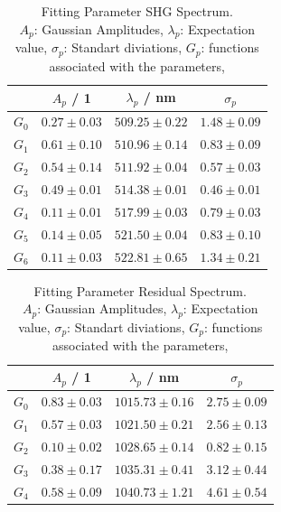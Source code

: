 \begin{table}[H]
    \label{}
    \centering
    \caption{Fitting Parameter SHG Spectrum. \\
    $A_p$: Gaussian Amplitudes,
    $\lambda_p$: Expectation value,
    $\sigma_p$: Standart diviations,
    $G_p$: functions associated with the parameters,}
    
    \begin{tabular}{c|ccc} \hline
        &  $A_p$ / 1 &  $\lambda_p$ / nm & $\sigma_p$ \\ \hline \hline 
    $G_0$&$0.27 \pm 0.03$&$509.25 \pm 0.22$&$1.48 \pm 0.09$\\ \hline
    $G_1$&$0.61 \pm 0.10$&$510.96 \pm 0.14$&$0.83 \pm 0.09$\\ \hline
    $G_2$&$0.54 \pm 0.14$&$511.92 \pm 0.04$&$0.57 \pm 0.03$\\ \hline
    $G_3$&$0.49 \pm 0.01$&$514.38 \pm 0.01$&$0.46 \pm 0.01$\\ \hline
    $G_4$&$0.11 \pm 0.01$&$517.99 \pm 0.03$&$0.79 \pm 0.03$\\ \hline
    $G_5$&$0.14 \pm 0.05$&$521.50 \pm 0.04$&$0.83 \pm 0.10$\\ \hline
    $G_6$&$0.11 \pm 0.03$&$522.81 \pm 0.65$&$1.34 \pm 0.21$\\ \hline
    \end{tabular}
    \end{table}

\begin{table}[H]
        \label{}
        \centering
        \caption{Fitting Parameter Residual Spectrum. \\
        $A_p$: Gaussian Amplitudes,
        $\lambda_p$: Expectation value,
        $\sigma_p$: Standart diviations,
        $G_p$: functions associated with the parameters,}
        \begin{tabular}{c|ccc} \hline
            &  $A_p$ / 1 &  $\lambda_p$ / nm & $\sigma_p$ \\ \hline  \hline 
        $G_0$&$0.83 \pm 0.03$&$1015.73 \pm 0.16$&$2.75 \pm 0.09$\\ \hline
        $G_1$&$0.57 \pm 0.03$&$1021.50 \pm 0.21$&$2.56 \pm 0.13$\\ \hline
        $G_2$&$0.10 \pm 0.02$&$1028.65 \pm 0.14$&$0.82 \pm 0.15$\\ \hline
        $G_3$&$0.38 \pm 0.17$&$1035.31 \pm 0.41$&$3.12 \pm 0.44$\\ \hline
        $G_4$&$0.58 \pm 0.09$&$1040.73 \pm 1.21$&$4.61 \pm 0.54$\\ \hline
        \end{tabular}
\end{table}   
    
